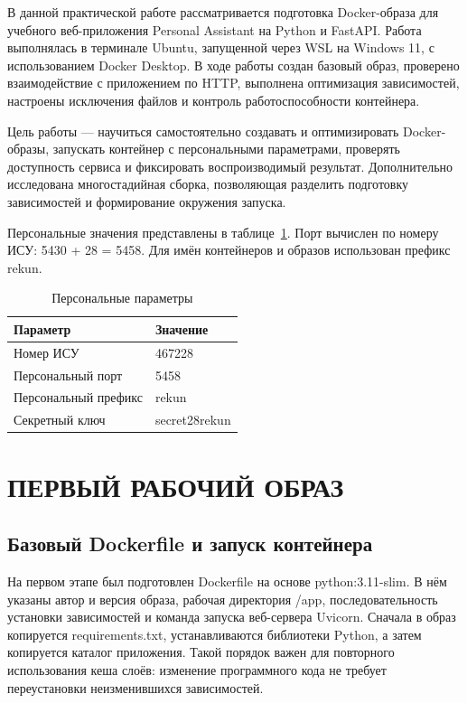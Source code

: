 \documentclass[14pt,a4paper]{extarticle}
\begin{document}

\setcounter{page}{2}
\tableofcontents
\clearpage
{}
В данной практической работе рассматривается подготовка Docker-образа для учебного веб-приложения Personal Assistant на Python и FastAPI. Работа выполнялась в терминале Ubuntu, запущенной через WSL на Windows 11, с использованием Docker Desktop. В ходе работы создан базовый образ, проверено взаимодействие с приложением по HTTP, выполнена оптимизация зависимостей, настроены исключения файлов и контроль работоспособности контейнера.

Цель работы — научиться самостоятельно создавать и оптимизировать Docker-образы, запускать контейнер с персональными параметрами, проверять доступность сервиса и фиксировать воспроизводимый результат. Дополнительно исследована многостадийная сборка, позволяющая разделить подготовку зависимостей и формирование окружения запуска.

Персональные значения представлены в таблице~\ref{tab:params}. Порт вычислен по номеру ИСУ: 5430 + 28 = 5458. Для имён контейнеров и образов использован префикс rekun.
\begin{table}[H]
\caption{Персональные параметры}\label{tab:params}
\centering
\begin{tabular}{|l|l|}\hline
Параметр & Значение\\\hline
Номер ИСУ & 467228\\\hline
Персональный порт & 5458\\\hline
Персональный префикс & rekun\\\hline
Секретный ключ & secret28rekun\\\hline
\end{tabular}
\end{table}


\clearpage
\section{ПЕРВЫЙ РАБОЧИЙ ОБРАЗ}
\subsection{Базовый Dockerfile и запуск контейнера}

На первом этапе был подготовлен Dockerfile на основе python:3.11-slim. В нём указаны автор и версия образа, рабочая директория /app, последовательность установки зависимостей и команда запуска веб-сервера Uvicorn. Сначала в образ копируется requirements.txt, устанавливаются библиотеки Python, а затем копируется каталог приложения. Такой порядок важен для повторного использования кеша слоёв: изменение программного кода не требует переустановки неизменившихся зависимостей.
\end{document}
